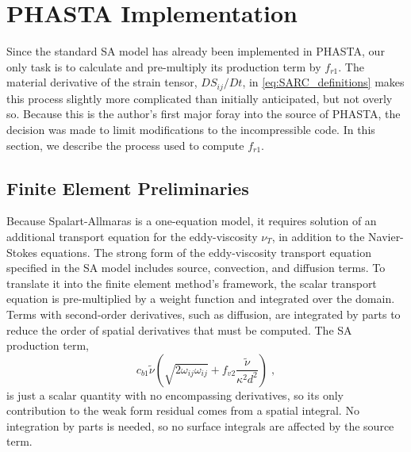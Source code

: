\documentclass[11pt]{article}
\begin{document}
\section{PHASTA Implementation} %

Since the standard SA model has already been implemented in PHASTA, our only task is to calculate and pre-multiply its production term by $f_{r1}$. The material derivative of the strain tensor, $DS_{ij}/Dt$, in \eqref{eq:SARC_definitions} makes this process slightly more complicated than initially anticipated, but not overly so. Because this is the author's first major foray into the source of PHASTA, the decision was made to limit modifications to the incompressible code. In this section, we describe the process used to compute $f_{r1}$.

\subsection{Finite Element Preliminaries}

Because Spalart-Allmaras is a one-equation model, it requires solution of an additional transport equation for the eddy-viscosity $\nu_T$, in addition to the Navier-Stokes equations. The strong form of the eddy-viscosity transport equation specified in the SA model includes source, convection, and diffusion terms. To translate it into the finite element method's framework, the scalar transport equation is pre-multiplied by a weight function and integrated over the domain. Terms with second-order derivatives, such as diffusion, are integrated by parts to reduce the order of spatial derivatives that must be computed. The SA production term,
\begin{equation}
c_{b1}
\tilde{\nu}
\left( \sqrt{2 \omega_{ij} \omega_{ij}} + f_{v2} \frac{\tilde{\nu}}{\kappa^2 d^2} \right)
\;,
\end{equation}
is just a scalar quantity with no encompassing derivatives, so its only contribution to the weak form residual comes from a spatial integral. No integration by parts is needed, so no surface integrals are affected by the source term.
\end{document}
